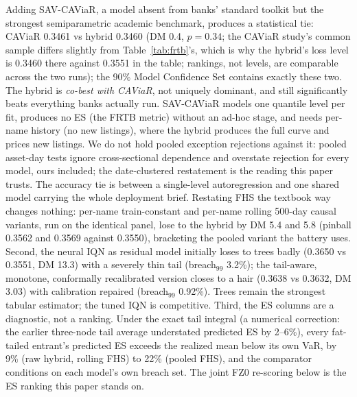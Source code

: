 \documentclass[11pt]{article}
\theoremstyle{remark}
\begin{document}
Adding SAV-CAViaR, a model
absent from banks' standard toolkit
but the strongest semiparametric
academic benchmark, produces a statistical tie: CAViaR 0.3461 vs
hybrid 0.3460 (DM 0.4, $p=0.34$; the CAViaR study's common sample
differs slightly from Table~\ref{tab:frtb}'s, which is why the hybrid's
loss level is 0.3460 there against 0.3551 in the table; rankings, not
levels, are comparable across the two runs); the 90\% Model Confidence
Set contains exactly these two. The hybrid is \emph{co-best with CAViaR},
not uniquely dominant, and still significantly beats everything banks
actually run. SAV-CAViaR models one quantile level per fit, produces
no ES (the FRTB metric) without an ad-hoc stage, and needs per-name
history (no new listings), where the hybrid produces the full curve
and prices new listings. We do not
hold pooled exception rejections against it: pooled asset-day tests
ignore cross-sectional dependence and overstate rejection for every
model, ours included; the date-clustered restatement is the reading
this paper trusts. The accuracy tie is between a
single-level autoregression and one shared model carrying the whole
deployment brief.
Restating FHS the textbook way changes nothing: per-name
train-constant and per-name rolling 500-day causal variants, run on
the identical panel, lose to the hybrid by DM 5.4 and 5.8 (pinball
0.3562 and 0.3569 against 0.3550), bracketing the pooled variant the
battery uses. Second, the neural IQN as residual model initially loses
to trees badly (0.3650 vs 0.3551, DM 13.3) with a severely thin tail
(breach$_{99}$ 3.2\%); the tail-aware, monotone, conformally
recalibrated version closes to a hair (0.3638 vs 0.3632, DM 3.03) with
calibration repaired (breach$_{99}$ 0.92\%). Trees remain the strongest
tabular estimator; the tuned IQN is competitive.
Third, the ES columns are a diagnostic, not a ranking. Under the
exact tail integral (a numerical correction: the earlier three-node
tail average understated predicted ES by 2--6\%),
every fat-tailed entrant's predicted ES exceeds the realized mean
below its own VaR, by 9\% (raw hybrid, rolling FHS) to 22\% (pooled
FHS), and the comparator conditions on each model's own breach set.
The joint FZ0 re-scoring below is the ES ranking this paper stands
on.
\end{document}
